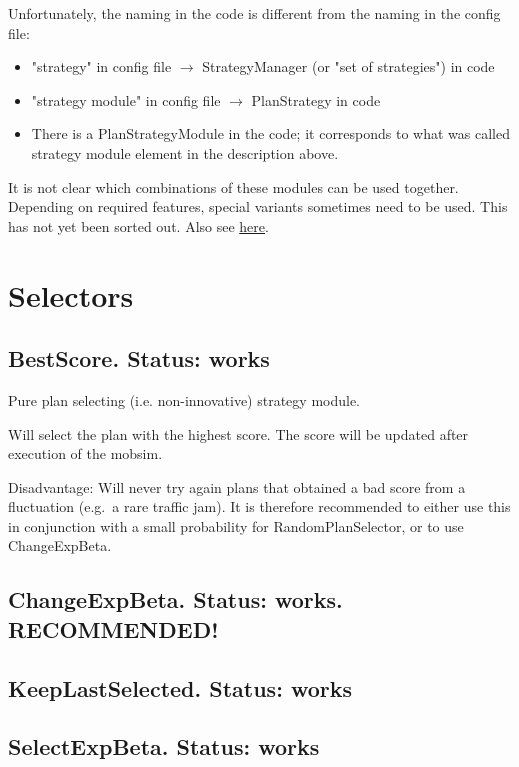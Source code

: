 Unfortunately, the naming in the code is different from the naming in the config file:
\begin{itemize}
	\item "strategy" in config file $\rightarrow$ StrategyManager (or "set of strategies") in code
	\item "strategy module" in config file $\rightarrow$ PlanStrategy in code
	\item There is a PlanStrategyModule in the code; it corresponds to what was called strategy module element in the description above.
\end{itemize}

It is not clear which combinations of these modules can be used  together. Depending on required features, special variants sometimes  need to be used. This has not yet been sorted out. Also see \href{http://matsim.org/node/690}{here}.


\vfill\eject
\section{Selectors}
\label{sec:selectors}

\subsection{BestScore.  Status: works}

Pure plan selecting (i.e. non-innovative) strategy module.

Will select the plan with the highest score. The score will be updated after execution of the mobsim.

Disadvantage: Will never try again plans that obtained a bad score  from a fluctuation (e.g.\ a rare traffic jam). It is therefore  recommended to either use this in conjunction with a small probability  for RandomPlanSelector, or to use ChangeExpBeta.

\subsection{ChangeExpBeta. Status: works. RECOMMENDED!}

\subsection{KeepLastSelected. Status: works}

\subsection{SelectExpBeta. Status: works}

